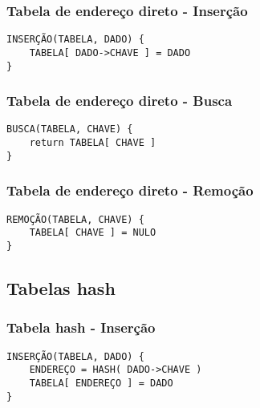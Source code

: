 \documentclass[10pt,svgnames]{beamer}
\begin{document}
\begin{frame}[fragile]
\frametitle{Tabela de endereço direto - Inserção}
\begin{verbatim}
INSERÇÃO(TABELA, DADO) {
    TABELA[ DADO->CHAVE ] = DADO
}
\end{verbatim}
\end{frame}

\begin{frame}[fragile]
\frametitle{Tabela de endereço direto - Busca}
\begin{verbatim}
BUSCA(TABELA, CHAVE) {
    return TABELA[ CHAVE ]
}
\end{verbatim}
\end{frame}

\begin{frame}[fragile]
\frametitle{Tabela de endereço direto - Remoção}
\begin{verbatim}
REMOÇÃO(TABELA, CHAVE) {
    TABELA[ CHAVE ] = NULO
}
\end{verbatim}
\end{frame}

\subsection{Tabelas hash}



\begin{frame}[fragile]
\frametitle{Tabela hash - Inserção}
\begin{verbatim}
INSERÇÃO(TABELA, DADO) {
    ENDEREÇO = HASH( DADO->CHAVE )
    TABELA[ ENDEREÇO ] = DADO
}
\end{verbatim}
\end{frame}
\end{document}
